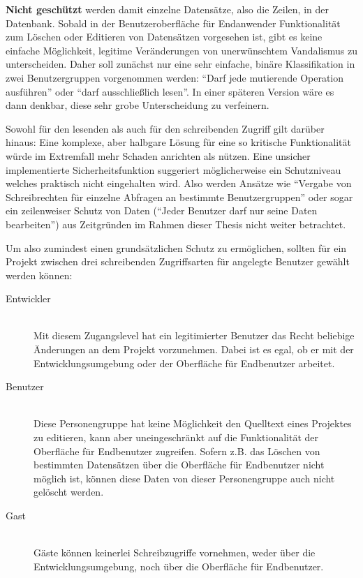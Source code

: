 \textbf{Nicht geschützt} werden damit einzelne Datensätze, also die Zeilen, in der Datenbank. Sobald in der Benutzeroberfläche für Endanwender Funktionalität zum Löschen oder Editieren von Datensätzen vorgesehen ist, gibt es keine einfache Möglichkeit, legitime Veränderungen von unerwünschtem Vandalismus zu unterscheiden. Daher soll zunächst nur eine sehr einfache, binäre Klassifikation in zwei Benutzergruppen vorgenommen werden: "`Darf jede mutierende Operation ausführen"' oder "`darf ausschließlich lesen"'. In einer späteren Version wäre es dann denkbar, diese sehr grobe Unterscheidung zu verfeinern.

Sowohl für den lesenden als auch für den schreibenden Zugriff gilt darüber hinaus: Eine komplexe, aber halbgare Lösung für eine so kritische Funktionalität würde im Extremfall mehr Schaden anrichten als nützen. Eine unsicher implementierte Sicherheitsfunktion suggeriert möglicherweise ein Schutzniveau welches praktisch nicht eingehalten wird. Also werden Ansätze wie "`Vergabe von Schreibrechten für einzelne Abfragen an bestimmte Benutzergruppen"' oder sogar ein zeilenweiser Schutz von Daten ("`Jeder Benutzer darf nur seine Daten bearbeiten"') aus Zeitgründen im Rahmen dieser Thesis nicht weiter betrachtet.

Um also zumindest einen grundsätzlichen Schutz zu ermöglichen, sollten für ein Projekt zwischen drei schreibenden Zugriffsarten für angelegte Benutzer gewählt werden können:


\begin{description}
  \item[Entwickler] \hfill \\
    Mit diesem Zugangslevel hat ein legitimierter Benutzer das Recht beliebige Änderungen an dem Projekt vorzunehmen. Dabei ist es egal, ob er mit der Entwicklungsumgebung oder der Oberfläche für Endbenutzer arbeitet.
  \item[Benutzer] \hfill \\
    Diese Personengruppe hat keine Möglichkeit den Quelltext eines Projektes zu editieren, kann aber uneingeschränkt auf die Funktionalität der Oberfläche für Endbenutzer zugreifen. Sofern z.B. das Löschen von bestimmten Datensätzen über die Oberfläche für Endbenutzer nicht möglich ist, können diese Daten von dieser Personengruppe auch nicht gelöscht werden.
  \item[Gast] \hfill \\
    Gäste können keinerlei Schreibzugriffe vornehmen, weder über die Entwicklungsumgebung, noch über die Oberfläche für Endbenutzer.
\end{description}

